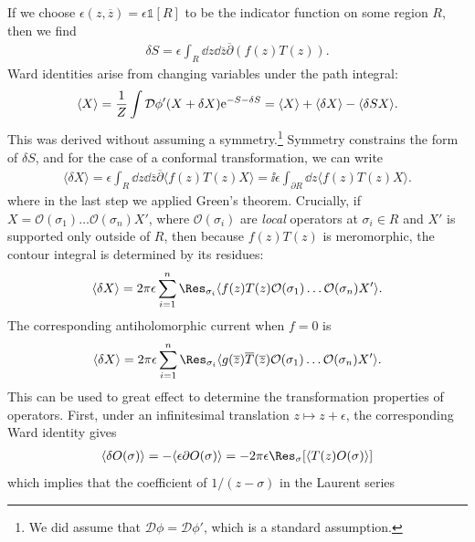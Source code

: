 If we choose $\epsilon(z, \overline z) = \epsilon \mathds 1[R]$ to be the indicator function on some region
$R$, then we find
\begin{align}
  \delta S = \epsilon\int_{R} \dd z \dd \overline z  \overline \partial(f(z)T(z)).
\end{align}
Ward identities arise from changing variables under the path integral:
\begin{align}
  \langle  X \rangle = \frac{1}{Z}\int \mathcal D \phi'(X + \delta X)\mathrm e^{-S - \delta S} = \langle  X \rangle + \langle  \delta X \rangle - \langle \delta S X \rangle.
\end{align}
This was derived without assuming a symmetry.\footnote{We did assume that
  $\mathcal D\phi = \mathcal D\phi'$, which is a standard assumption.}
Symmetry constrains the form of
$\delta S$, and for the case of a conformal transformation, we can write
\begin{align}
\langle  \delta X \rangle = \epsilon\int_R \dd z \dd \overline z \overline \partial\langle f(z)T(z)X \rangle = \ii\epsilon\int_{\partial R} \dd z \langle f(z)T(z)X \rangle.
\end{align}
where in the last step we applied Green's theorem.
Crucially, if $X = \mathcal O(\sigma_1)\ldots \mathcal O(\sigma_n)X'$, where
$\mathcal O(\sigma_i)$ are \emph{local} operators at $\sigma_i \in R$ and $X'$
is supported only outside of $R$, then because $f(z)T(z)$ is meromorphic, the
contour integral is determined by its residues:
\begin{align}
\langle  \delta X \rangle = 2\pi \epsilon\sum_{i=1}^n\Res_{\sigma_i}\langle  f(z)T(z)\mathcal O(\sigma_1)\ldots \mathcal O(\sigma_n)X' \rangle.
\end{align}
The corresponding antiholomorphic current when $f = 0$ is 
\begin{align}
\langle  \delta X \rangle = 2\pi\epsilon\sum_{i=1}^n\Res_{\sigma_i}\langle  g(\overline z)\overline T(\overline z)\mathcal O(\sigma_1)\ldots \mathcal O(\sigma_n)X' \rangle.\label{eq:Ward}
\end{align}
This can be used to great effect to determine the transformation properties of
operators.
First, under an infinitesimal translation $z \mapsto z
+ \epsilon$, the corresponding Ward identity gives
\begin{align}
  \langle  \delta O(\sigma) \rangle = -\langle  \epsilon \partial O(\sigma) \rangle = -2\pi \epsilon\Res_{\sigma}[\langle T(z)O(\sigma)\rangle]
\end{align}
which implies that the coefficient of $1/(z - \sigma)$ in the Laurent series
